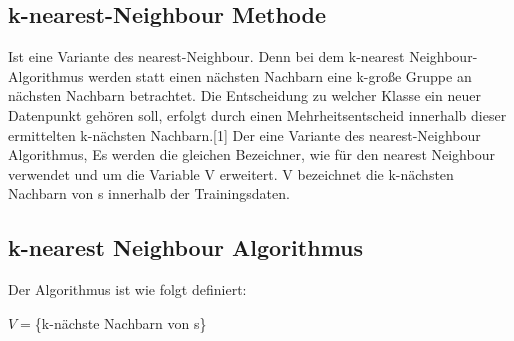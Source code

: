 \documentclass[a4paper]{scrartcl}
\begin{document}
\begin{multicols}{2}
                        \section{k-nearest-Neighbour Methode}
                        Ist eine Variante des nearest-Neighbour. Denn bei dem k-nearest Neighbour-Algorithmus werden statt einen nächsten Nachbarn eine k-große Gruppe an nächsten Nachbarn betrachtet. Die Entscheidung zu welcher Klasse ein neuer Datenpunkt gehören soll, erfolgt durch einen Mehrheitsentscheid innerhalb dieser ermittelten k-nächsten Nachbarn.[1]
                        Der eine Variante des nearest-Neighbour Algorithmus, 
                        Es werden die gleichen Bezeichner, wie für den nearest Neighbour verwendet und um die Variable V erweitert. V bezeichnet die k-nächsten Nachbarn von s innerhalb der Trainingsdaten.
        
                           
                        \subsection{k-nearest Neighbour Algorithmus}
                        Der Algorithmus ist wie folgt definiert:
                        \begin{algorithm}[H]
                             $V= $\{k-nächste Nachbarn von s\}\;
                              {
                               \KwRet{+}\;
                               }
                               {
                                  \;
                                 }
                           

\end{algorithm}
\end{multicols}
\end{document}
